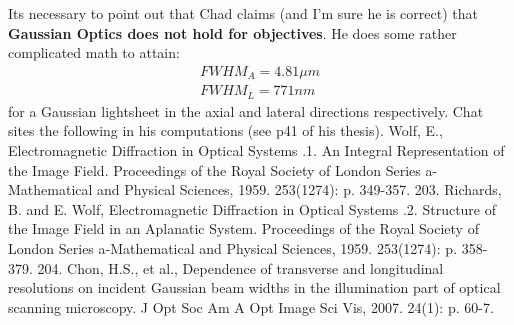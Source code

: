 Its necessary to point out that Chad claims (and I'm sure he is correct) that \textbf{Gaussian Optics does not hold for objectives}. He does some rather complicated math to attain:
\begin{gather}
    FWHM_A=4.81 \mu m\\
    FWHM_L = 771nm
\end{gather}
for a Gaussian lightsheet in the axial and lateral directions respectively.
Chat sites the following in his computations (see p41 of his thesis).
    Wolf, E., Electromagnetic Diffraction in Optical Systems .1. An Integral Representation of the Image Field. Proceedings of the Royal Society of London Series a-Mathematical and Physical Sciences, 1959. 253(1274): p. 349-357.
203. Richards, B. and E. Wolf, Electromagnetic Diffraction in Optical Systems .2. Structure of the Image Field in an Aplanatic System. Proceedings of the Royal Society of London Series a-Mathematical and Physical Sciences, 1959. 253(1274): p. 358-379.
204. Chon, H.S., et al., Dependence of transverse and longitudinal resolutions on incident Gaussian beam widths in the illumination part of optical scanning microscopy. J Opt Soc Am A Opt Image Sci Vis, 2007. 24(1): p. 60-7.


